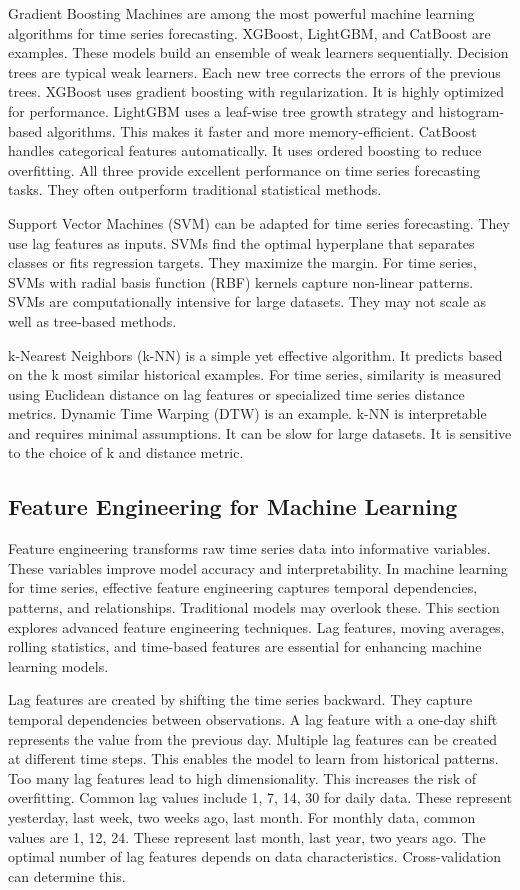 Gradient Boosting Machines are among the most powerful machine learning algorithms for time series forecasting. XGBoost, LightGBM, and CatBoost are examples. These models build an ensemble of weak learners sequentially. Decision trees are typical weak learners. Each new tree corrects the errors of the previous trees. XGBoost uses gradient boosting with regularization. It is highly optimized for performance. LightGBM uses a leaf-wise tree growth strategy and histogram-based algorithms. This makes it faster and more memory-efficient. CatBoost handles categorical features automatically. It uses ordered boosting to reduce overfitting. All three provide excellent performance on time series forecasting tasks. They often outperform traditional statistical methods.

Support Vector Machines (SVM) can be adapted for time series forecasting. They use lag features as inputs. SVMs find the optimal hyperplane that separates classes or fits regression targets. They maximize the margin. For time series, SVMs with radial basis function (RBF) kernels capture non-linear patterns. SVMs are computationally intensive for large datasets. They may not scale as well as tree-based methods.

k-Nearest Neighbors (k-NN) is a simple yet effective algorithm. It predicts based on the k most similar historical examples. For time series, similarity is measured using Euclidean distance on lag features or specialized time series distance metrics. Dynamic Time Warping (DTW) is an example. k-NN is interpretable and requires minimal assumptions. It can be slow for large datasets. It is sensitive to the choice of k and distance metric.

\subsection{Feature Engineering for Machine Learning}

Feature engineering transforms raw time series data into informative variables. These variables improve model accuracy and interpretability. In machine learning for time series, effective feature engineering captures temporal dependencies, patterns, and relationships. Traditional models may overlook these. This section explores advanced feature engineering techniques. Lag features, moving averages, rolling statistics, and time-based features are essential for enhancing machine learning models.

Lag features are created by shifting the time series backward. They capture temporal dependencies between observations. A lag feature with a one-day shift represents the value from the previous day. Multiple lag features can be created at different time steps. This enables the model to learn from historical patterns. Too many lag features lead to high dimensionality. This increases the risk of overfitting. Common lag values include 1, 7, 14, 30 for daily data. These represent yesterday, last week, two weeks ago, last month. For monthly data, common values are 1, 12, 24. These represent last month, last year, two years ago. The optimal number of lag features depends on data characteristics. Cross-validation can determine this.

